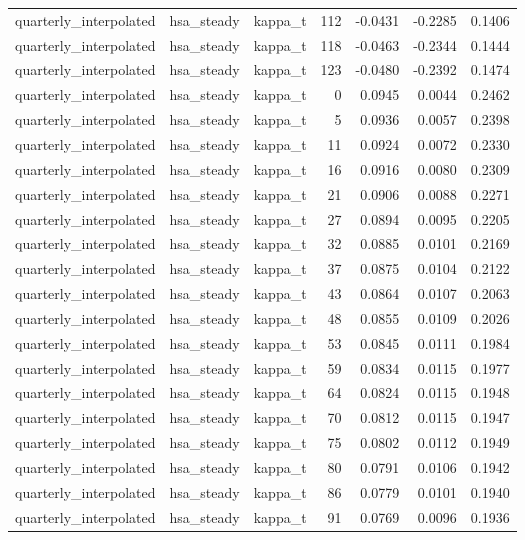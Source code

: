 \begin{tabular}{lllrrrr}
quarterly\_interpolated & hsa\_steady & kappa\_t & 112 & -0.0431 & -0.2285 & 0.1406 \\
quarterly\_interpolated & hsa\_steady & kappa\_t & 118 & -0.0463 & -0.2344 & 0.1444 \\
quarterly\_interpolated & hsa\_steady & kappa\_t & 123 & -0.0480 & -0.2392 & 0.1474 \\
quarterly\_interpolated & hsa\_steady & kappa\_t & 0 & 0.0945 & 0.0044 & 0.2462 \\
quarterly\_interpolated & hsa\_steady & kappa\_t & 5 & 0.0936 & 0.0057 & 0.2398 \\
quarterly\_interpolated & hsa\_steady & kappa\_t & 11 & 0.0924 & 0.0072 & 0.2330 \\
quarterly\_interpolated & hsa\_steady & kappa\_t & 16 & 0.0916 & 0.0080 & 0.2309 \\
quarterly\_interpolated & hsa\_steady & kappa\_t & 21 & 0.0906 & 0.0088 & 0.2271 \\
quarterly\_interpolated & hsa\_steady & kappa\_t & 27 & 0.0894 & 0.0095 & 0.2205 \\
quarterly\_interpolated & hsa\_steady & kappa\_t & 32 & 0.0885 & 0.0101 & 0.2169 \\
quarterly\_interpolated & hsa\_steady & kappa\_t & 37 & 0.0875 & 0.0104 & 0.2122 \\
quarterly\_interpolated & hsa\_steady & kappa\_t & 43 & 0.0864 & 0.0107 & 0.2063 \\
quarterly\_interpolated & hsa\_steady & kappa\_t & 48 & 0.0855 & 0.0109 & 0.2026 \\
quarterly\_interpolated & hsa\_steady & kappa\_t & 53 & 0.0845 & 0.0111 & 0.1984 \\
quarterly\_interpolated & hsa\_steady & kappa\_t & 59 & 0.0834 & 0.0115 & 0.1977 \\
quarterly\_interpolated & hsa\_steady & kappa\_t & 64 & 0.0824 & 0.0115 & 0.1948 \\
quarterly\_interpolated & hsa\_steady & kappa\_t & 70 & 0.0812 & 0.0115 & 0.1947 \\
quarterly\_interpolated & hsa\_steady & kappa\_t & 75 & 0.0802 & 0.0112 & 0.1949 \\
quarterly\_interpolated & hsa\_steady & kappa\_t & 80 & 0.0791 & 0.0106 & 0.1942 \\
quarterly\_interpolated & hsa\_steady & kappa\_t & 86 & 0.0779 & 0.0101 & 0.1940 \\
quarterly\_interpolated & hsa\_steady & kappa\_t & 91 & 0.0769 & 0.0096 & 0.1936 \\

\end{tabular}
